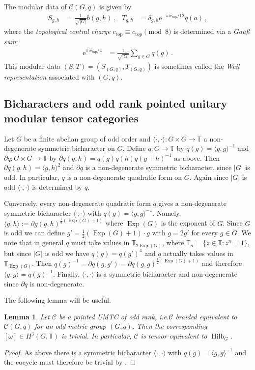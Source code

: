 \documentclass[twoside,11pt,reqno]{amsart}
\makeatletter
\newtheorem{lem}[thm]{Lemma}
\theoremstyle{definition}
\theoremstyle{remark}
\newcommand{\cC}{\mathcal{C}}
\newcommand{\TT}{\mathbb{T}}
\newcommand{\e}{\mathrm{e}}
\newcommand{\ima}{\mathrm{i}}
\DeclareRobustCommand{\ie}{i.e.\@\xspace}
\DeclareMathOperator{\Exp}{Exp}
\DeclareMathOperator{\Vect}{Hilb}
\newcommand{\bi}[2]{\langle #1,#2\rangle}
\newcommand{\bislotslot}{\bi\cdot\cdot}
\newcommand{\myemph}[1]{\emph{#1}}
\makeatother
\begin{document}
The modular data of $\cC(G,q)$
is given by
\begin{align}
  S_{g,h}&=\frac{1}{\sqrt{|G|}}b(g,h)\,, & %
%
  T_{g,h}&=\delta_{g,h} \e^{-\pi\ima c_\mathrm{top}/12}q(a)%
  \,,
\end{align}
%
where the \emph{topological central charge} 
$c_\mathrm{top} \equiv c_\mathrm{top} \pmod 8$ is determined via a 
\emph{Gauß sum}:
\begin{align}
  \label{eq:GaussSum}
  \e^{\pi \ima c_\mathrm{top}/4}&=\frac1{\sqrt{|G|}}\sum_{g\in G}  q(g)\,.
\end{align}
This modular data $(S,T)=(S_{(G,q)},T_{(G,q)})$ is sometimes called the 
\myemph{Weil representation} associated with $(G,q)$.


\subsection{Bicharacters and odd rank pointed unitary modular tensor categories}
Let $G$ be a finite abelian group of odd order and 
$\bislotslot\colon G\times G \to \TT$ a
non-degenerate symmetric bicharacter on $G$. 
Define $q\colon G\to \TT$ by $q(g)=\bi gg^{-1}$ and 
$\partial q\colon G\times G \to \TT$ by
$\partial q(g,h)=q(g)q(h)q(g+h)^{-1}$ as above.
Then $\partial q(g,h)=\bi gh^2$ and $\partial q$ 
is a non-degenerate symmetric bicharacter, since $|G|$ is odd.
In particular, $q$ is a non-degenerate quadratic form on $G$.
Again since $|G|$ is odd $\bislotslot$ is determined by $q$. 

Conversely, every non-degenerate quadratic form $q$ 
gives a non-degenerate symmetric bicharacter $\bislotslot$ with $q(g)=\bi gg ^{-1}$.
Namely, $\bi gh:=\partial g(g,h)^{\frac12(\Exp(G)+1)}$ 
where $\Exp(G)$ is the exponent of $G$. 
%
%
%
Since $G$ is odd we can define  
$g'=\frac12(\Exp(G)+1)\cdot g$ with  $g=2g'$ for every $g\in G$. 
%
%
We note that in general $q$ must take values in  $\TT_{2\Exp(G)}$, where $\TT_n=\{z\in \TT: z^n=1\}$, but
since $|G|$ is odd we have $q(g)=q(g')^4$ and $q$ actually takes values in $\TT_{\Exp(G)}$.
Then $q(g)^{-1}=\partial q(g,g')=\partial q(g,g)^{\frac12(\Exp(G)+1)}$ and therefore $\bi gg = q(g)^{-1}$. 
Finally, $\bislotslot$ is a symmetric bicharacter and non-degenerate since 
$\partial q$ is non-degenerate. 


The following lemma will be useful.
\begin{lem}%
  \label{lem:TrivialCocycle}
  Let $\cC$ be a pointed UMTC of odd rank, \ie $\cC$ braided equivalent to 
  $\cC(G,q)$ for an odd metric group $(G,q)$. Then 
  the corresponding $[\omega]\in H^3(G,\TT)$ is trivial. 
  In particular, $\cC$ is tensor equivalent to $\Vect_G$.
\end{lem}
\begin{proof}
  As above there is a symmetric bicharacter $\bislotslot$ with $q(g)=\bi g g^{-1}$ and the cocycle must therefore be trivial by 
  {\cite[Lemma 4.4]{LiNg2014}}.
\end{proof}
\end{document}
